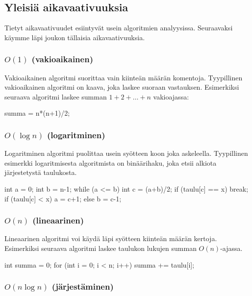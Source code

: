\subsection{Yleisiä aikavaativuuksia}

Tietyt aikavaativuudet esiintyvät usein algoritmien analyysissa.
Seuraavaksi käymme läpi joukon tällaisia aikavaativuuksia.

\subsubsection{$O(1)$ (vakioaikainen)}

Vakioaikainen algoritmi suorittaa vain kiinteän määrän komentoja.
Tyypillinen vakioaikainen algoritmi on kaava, joka laskee
suoraan vastauksen. Esimerkiksi seuraava algoritmi laskee
summan $1+2+\dots+n$ vakioajassa:

\begin{code}
summa = n*(n+1)/2;
\end{code}

\subsubsection{$O(\log n)$ (logaritminen)}

Logaritminen algoritmi puolittaa usein syötteen koon
joka askeleella. Tyypillinen esimerkki logaritmisesta algoritmista
on binäärihaku, joka etsii alkiota järjestetystä taulukosta.

\begin{code}
int a = 0;
int b = n-1;
while (a <= b) {
    int c = (a+b)/2;
    if (taulu[c] == x) break;
    if (taulu[c] < x) a = c+1;
    else b = c-1;
}
\end{code}

\subsubsection{$O(n)$ (lineaarinen)}

Lineaarinen algoritmi voi käydä läpi syötteen kiinteän määrän kertoja.
Esimerkiksi seuraava algoritmi laskee taulukon lukujen summan $O(n)$-ajassa.

\begin{code}
int summa = 0;
for (int i = 0; i < n; i++) {
    summa += taulu[i];
}
\end{code}

\subsubsection{$O(n \log n)$ (järjestäminen)}

